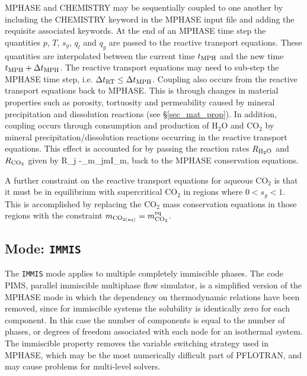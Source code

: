 MPHASE and CHEMISTRY may be sequentially coupled to one another by including the CHEMISTRY keyword in the MPHASE input file and adding the requisite associated keywords. At the end of an MPHASE time step the quantities $p$, $T$, $s_g$, $q_l$ and $q_g$ are passed to the reactive transport equations. These quantities are interpolated between the current time $t_{\rm MPH}$ and the new time $t_{\rm MPH}+\Delta t_{\rm MPH}$. The reactive transport equations may need to sub-step the MPHASE time step, i.e. $\Delta t_{\rm RT} \leq \Delta t_{\rm MPH}$. Coupling also occurs from the reactive transport equations back to MPHASE. This is through changes in material properties such as porosity, tortuosity and permeability caused by mineral precipitation and dissolution reactions (see \S\ref{sec_mat_prop}). In addition, coupling occurs through consumption and production of H$_2$O and CO$_2$ by mineral precipitation/dissolution reactions occurring in the reactive transport equations. This effect is accounted for by passing the reaction rates $R_{\rm H_2O}$ and $R_{\rm CO_2}$ given by
\EQ
R_j \eq -\sum_m\nu_{jm}I_m,
\EN
back to the MPHASE conservation equations. 

A further constraint on the reactive transport equations for aqueous CO$_2$ is that it must be in equilibrium with supercritical CO$_2$ in regions where $0< s_g <1$. This is accomplished by replacing the CO$_2$ mass conservation equations in those regions with the constraint $m_{\rm CO_{\rm 2(aq)}} = m_{\rm CO_2}^{\rm eq}$.

\subsection{Mode: {\tt IMMIS}}

The {\tt IMMIS} mode applies to multiple completely immiscible phases.
The code PIMS, parallel immiscible multiphase flow simulator, is a simplified version of the  MPHASE mode in which the dependency on thermodynamic relations have been removed, since for immiscible systems the solubility is identically zero for each component. In this case the number of components is equal to the number of phases, or degrees of freedom associated with each node for an isothermal system. The immiscible property removes the variable switching strategy used in MPHASE, which may be the most numerically difficult part of PFLOTRAN, and may cause problems for multi-level solvers. 

